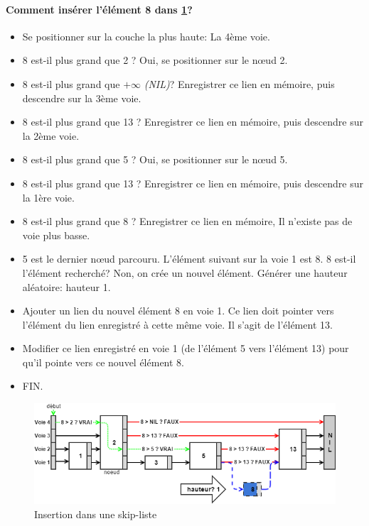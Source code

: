 \documentclass[hidelinks,a4paper, 12pt]{article}
\begin{document}
	\paragraph*{Comment insérer l'élément 8 dans \cref{SkipInsert1}?}
	\begin{itemize}
		\item Se positionner sur la couche la plus haute: La 4ème voie.
		\item 8 est-il plus grand que 2 ? Oui, se positionner sur le nœud 2.
		\item 8 est-il plus grand que $+\infty$ \textit{(NIL)}? Enregistrer ce lien en mémoire, puis descendre sur la 3ème voie.
		\item 8 est-il plus grand que 13  ? Enregistrer ce lien en mémoire, puis descendre sur la 2ème voie.
		\item 8 est-il plus grand que 5 ? Oui, se positionner sur le nœud 5.
		\item 8 est-il plus grand que 13 ? Enregistrer ce lien en mémoire, puis descendre sur la 1ère voie.
		\item 8 est-il plus grand que 8 ? Enregistrer ce lien en mémoire, Il n'existe pas de voie plus basse.
		\item 5 est le dernier nœud parcouru. L'élément suivant sur la voie 1 est 8. 8 est-il l'élément recherché? Non, on crée un nouvel élément. Générer une hauteur aléatoire: hauteur 1.
		\item Ajouter un lien du nouvel élément 8 en voie 1. Ce lien doit pointer vers l'élément du lien enregistré à cette même voie. Il s'agit de l'élément 13.
		\item Modifier ce lien enregistré en voie 1 (de l'élément 5 vers l'élément 13) pour qu'il pointe vers ce nouvel élément 8.
		\item FIN.
	\end{itemize}
	\begin{figure}[h]
		\includegraphics[width=\textwidth]{img/insert}
		\caption{Insertion dans une skip-liste}
		\label{SkipInsert1}
	\end{figure}
	
\end{document}
